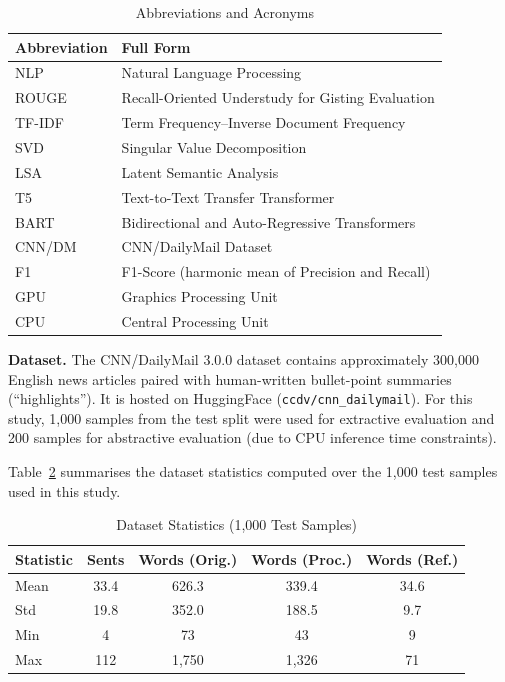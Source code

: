 \documentclass[conference]{IEEEtran}
\begin{document}
\begin{table}[h]
\caption{Abbreviations and Acronyms}
\label{tab:abbrev}
\centering
\begin{tabular}{ll}
\toprule
\textbf{Abbreviation} & \textbf{Full Form} \\
\midrule
NLP    & Natural Language Processing \\
ROUGE  & Recall-Oriented Understudy for Gisting Evaluation \\
TF-IDF & Term Frequency--Inverse Document Frequency \\
SVD    & Singular Value Decomposition \\
LSA    & Latent Semantic Analysis \\
T5     & Text-to-Text Transfer Transformer \\
BART   & Bidirectional and Auto-Regressive Transformers \\
CNN/DM & CNN/DailyMail Dataset \\
F1     & F1-Score (harmonic mean of Precision and Recall) \\
GPU    & Graphics Processing Unit \\
CPU    & Central Processing Unit \\
\bottomrule
\end{tabular}
\end{table}

\noindent\textbf{Dataset.}
The CNN/DailyMail 3.0.0 dataset \cite{hermann2015,nallapati2016} contains
approximately 300,000 English news articles paired with human-written
bullet-point summaries (``highlights''). It is hosted on HuggingFace
(\texttt{ccdv/cnn\_dailymail}). For this study, 1,000 samples from the
test split were used for extractive evaluation and 200 samples for
abstractive evaluation (due to CPU inference time constraints).

Table~\ref{tab:datastats} summarises the dataset statistics computed over
the 1,000 test samples used in this study.

\begin{table}[h]
\caption{Dataset Statistics (1,000 Test Samples)}
\label{tab:datastats}
\centering
\begin{tabular}{lcccc}
\toprule
\textbf{Statistic} & \textbf{Sents} & \textbf{Words (Orig.)} &
\textbf{Words (Proc.)} & \textbf{Words (Ref.)} \\
\midrule
Mean & 33.4  & 626.3  & 339.4  & 34.6 \\
Std  & 19.8  & 352.0  & 188.5  & 9.7  \\
Min  & 4     & 73     & 43     & 9    \\
Max  & 112   & 1,750  & 1,326  & 71   \\
\bottomrule
\end{tabular}
\end{table}
\end{document}
